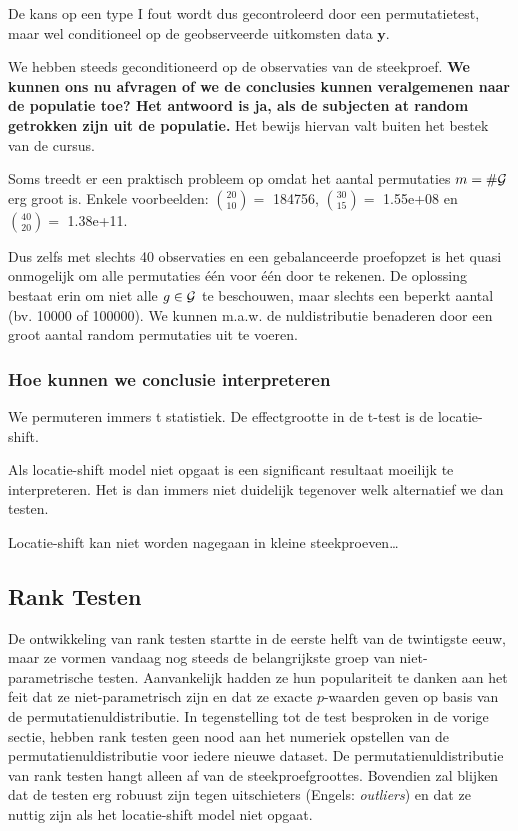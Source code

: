 \documentclass[
  12pt,dutch]{book}
\theoremstyle{definition}
\theoremstyle{definition}
\theoremstyle{definition}
\theoremstyle{definition}
\theoremstyle{remark}
\begin{document}
De kans op een type I fout wordt dus gecontroleerd door een permutatietest, maar wel conditioneel op de geobserveerde uitkomsten data \(\mathbf{y}\).

We hebben steeds geconditioneerd op de observaties van de steekproef. \textbf{We kunnen ons nu afvragen of we de conclusies kunnen veralgemenen naar de populatie toe? Het antwoord is ja, als de subjecten at random getrokken zijn uit de populatie.} Het bewijs hiervan valt buiten het bestek van de cursus.

Soms treedt er een praktisch probleem op omdat het aantal permutaties \(m=\#{\cal{G}}\) erg groot is. Enkele voorbeelden:
\(\binom{20}{10}=\) 184756, \(\binom{30}{15}=\) 1.55e+08 en \(\binom{40}{20}=\) 1.38e+11.

Dus zelfs met slechts 40 observaties en een gebalanceerde proefopzet is het quasi onmogelijk om alle permutaties één voor één door te rekenen.
De oplossing bestaat erin om niet alle \(g \in {\cal{G}}\) te beschouwen, maar slechts een beperkt aantal (bv. 10000 of 100000).
We kunnen m.a.w. de nuldistributie benaderen door een groot aantal random permutaties uit te voeren.

\subsubsection{Hoe kunnen we conclusie interpreteren}\label{hoe-kunnen-we-conclusie-interpreteren}

We permuteren immers t statistiek. De effectgrootte in de t-test is de locatie-shift.

Als locatie-shift model niet opgaat is een significant resultaat moeilijk te interpreteren. Het is dan immers niet duidelijk tegenover welk alternatief we dan testen.

Locatie-shift kan niet worden nagegaan in kleine steekproeven\ldots{}

\subsection{Rank Testen}\label{rank-testen}

De ontwikkeling van rank testen startte in de eerste helft van de twintigste eeuw, maar ze vormen vandaag nog steeds de belangrijkste groep van niet-parametrische testen. Aanvankelijk hadden ze hun populariteit te danken aan het feit dat ze niet-parametrisch zijn en dat ze exacte \(p\)-waarden geven op basis van de permutatienuldistributie. In tegenstelling tot de test besproken in de vorige sectie, hebben rank testen geen nood aan het numeriek opstellen van de permutatienuldistributie voor iedere nieuwe dataset. De permutatienuldistributie van rank testen hangt alleen af van de steekproefgroottes. Bovendien zal blijken dat de testen erg robuust zijn tegen uitschieters (Engels: \emph{outliers}) en dat ze nuttig zijn als het locatie-shift model niet opgaat.
\end{document}
